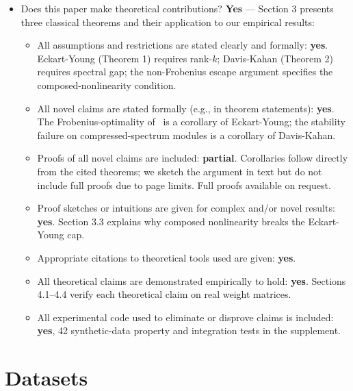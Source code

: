 \documentclass[letterpaper]{article}
\begin{document}
\begin{itemize}
\item Does this paper make theoretical contributions?
\textbf{Yes} --- Section 3 presents three classical theorems and their application to our empirical results:
\begin{itemize}
\item All assumptions and restrictions are stated clearly and formally: \textbf{yes}. Eckart-Young (Theorem 1) requires rank-$k$; Davis-Kahan (Theorem 2) requires spectral gap; the non-Frobenius escape argument specifies the composed-nonlinearity condition.
\item All novel claims are stated formally (e.g., in theorem statements): \textbf{yes}. The Frobenius-optimality of \svdomp\ is a corollary of Eckart-Young; the stability failure on compressed-spectrum modules is a corollary of Davis-Kahan.
\item Proofs of all novel claims are included: \textbf{partial}. Corollaries follow directly from the cited theorems; we sketch the argument in text but do not include full proofs due to page limits. Full proofs available on request.
\item Proof sketches or intuitions are given for complex and/or novel results: \textbf{yes}. Section 3.3 explains why composed nonlinearity breaks the Eckart-Young cap.
\item Appropriate citations to theoretical tools used are given: \textbf{yes}.
\item All theoretical claims are demonstrated empirically to hold: \textbf{yes}. Sections 4.1--4.4 verify each theoretical claim on real weight matrices.
\item All experimental code used to eliminate or disprove claims is included: \textbf{yes}, 42 synthetic-data property and integration tests in the supplement.
\end{itemize}
\end{itemize}

\section{Datasets}
\end{document}
